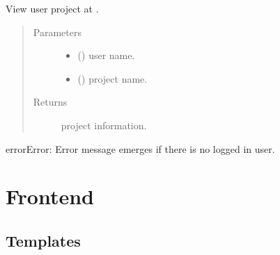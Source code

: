 \documentclass[a4paper,12pt,english]{sphinxmanual}
\begin{document}
\begin{fulllineitems}
\label{\detokenize{project_rst/user_rst/routes:project.user.views.project}}
View user project at .
\begin{quote}\begin{description}
\item[{Parameters}] \leavevmode\begin{itemize}
\item {} 
 () \textendash{} user name.

\item {} 
 () \textendash{} project name.

\end{itemize}

\item[{Returns}] \leavevmode
project information.

\end{description}\end{quote}

\begin{sphinxadmonition}{error}{Error:}
Error message emerges if there is no logged in user.
\end{sphinxadmonition}

\end{fulllineitems}



\section{Frontend}
\label{\detokenize{index:frontend}}

\subsection{Templates}
\label{\detokenize{templates:templates}}\label{\detokenize{templates::doc}}
\end{document}
